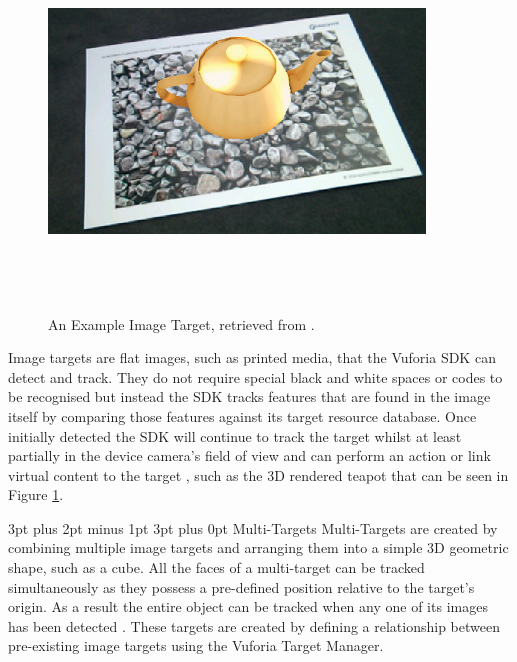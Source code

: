 \documentclass[12pt,a4paper,oneside]{article}
\makeatletter
\renewcommand\paragraph{\@startsection {paragraph}{1}{0mm} %
	                           {3pt plus 2pt minus 1pt} %
	                           {3pt plus 0pt} %
	                           {\normalfont}}
\makeatother
\begin{document}
\begin{figure}[!h]
	\centering
	\includegraphics[width=10cm,height=10cm,keepaspectratio]{images/imagetarget}
	\caption[Example Image Target]{An Example Image Target, retrieved from \footnotemark.}
	\label{fig_imagetarget}
\end{figure}
Image targets are flat images, such as printed media, that the Vuforia SDK can detect and track. They do not require special black and white spaces or codes to be recognised but instead the SDK tracks features that are found in the image itself by comparing those features against its target resource database. 
Once initially detected the SDK will continue to track the target whilst at least partially in the device camera's field of view and can perform an action or link virtual content to the target \cite{vuforiaimagetargets}, such as the 3D rendered teapot that can be seen in Figure \ref{fig_imagetarget}.

\paragraph{Multi-Targets}
Multi-Targets are created by combining multiple image targets and arranging them into a simple 3D geometric shape, such as a cube. All the faces of a multi-target can be tracked simultaneously as they possess a pre-defined position relative to the target's origin. As a result the entire object can be tracked when any one of its images has been detected  \cite{vuforiamultitargets}. These targets are created by defining a relationship between pre-existing image targets using the Vuforia Target Manager.
\end{document}
